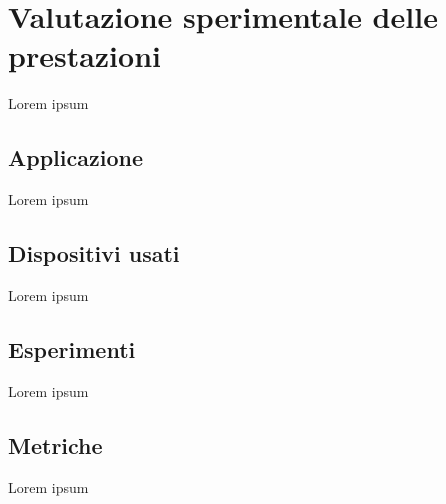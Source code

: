 \chapter{Valutazione sperimentale delle prestazioni}
Lorem ipsum

\section{Applicazione}
Lorem ipsum

\section{Dispositivi usati}
Lorem ipsum

\section{Esperimenti}
Lorem ipsum

\section{Metriche}
Lorem ipsum

\clearpage{\pagestyle{empty}\cleardoublepage}